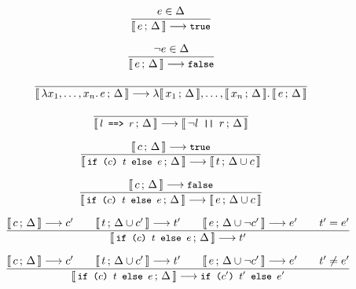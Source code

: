 \begin{figure}[htb]
\begin{framed}
 
\begin{equation}
\dfrac{
  e \in \Delta
}{
  \llbracket\, e\,;\, \Delta\, \rrbracket \longrightarrow \texttt{\small{true}}
}
\end{equation}

\begin{equation}
\dfrac{
  \neg e \in \Delta
}{
  \llbracket\, e\,;\, \Delta\, \rrbracket \longrightarrow \texttt{\small{false}}
}
\end{equation}

\begin{equation}
\dfrac{
  \empty
}{
  \lb{\lambda x_1, \ldots, x_n.\, e}{\Delta} \longrightarrow \lambda \lb{x_1}{\Delta}, \ldots, \lb{x_n}{\Delta}.\, \lb{e}{\Delta}
}
\end{equation}

\begin{equation}
\dfrac{
  \empty
}{
  \lb{\stt{$l$ ==> $r$}}{\Delta} \longrightarrow \lb{\neg l \stt{ || } r}{\Delta}
}
\end{equation}


\begin{equation}
\dfrac{
  \llbracket\, c\,;\, \Delta\, \rrbracket \longrightarrow \texttt{\small{true}}
}{
  \llbracket\, \texttt{\small{if ($c$) $t$ else $e$}}\,;\, \Delta\, \rrbracket \longrightarrow \llbracket\, t\,;\, \Delta \cup c\, \rrbracket
}
\end{equation}

\begin{equation}
\dfrac{
  \llbracket\, c\,;\, \Delta\, \rrbracket \longrightarrow \texttt{\small{false}}
}{
  \llbracket\, \texttt{\small{if ($c$) $t$ else $e$}}\,;\, \Delta\, \rrbracket \longrightarrow \llbracket\, e\,;\, \Delta \cup c\, \rrbracket
}
\end{equation}

\begin{equation}
\dfrac{
  \llbracket\, c\,;\, \Delta\, \rrbracket \longrightarrow c' \qquad
  \llbracket\, t\,;\, \Delta \cup c'\, \rrbracket \longrightarrow t' \qquad
  \llbracket\, e\,;\, \Delta \cup \neg c'\, \rrbracket \longrightarrow e' \qquad
  t' = e'
}{
  \llbracket\, \texttt{\small{if ($c$) $t$ else $e$}}\,;\, \Delta\, \rrbracket \longrightarrow t'
}
\end{equation}

\begin{equation}
\dfrac{
  \llbracket\, c\,;\, \Delta\, \rrbracket \longrightarrow c' \qquad
  \llbracket\, t\,;\, \Delta \cup c'\, \rrbracket \longrightarrow t' \qquad
  \llbracket\, e\,;\, \Delta \cup \neg c'\, \rrbracket \longrightarrow e' \qquad
  t' \not= e'
}{
  \llbracket\, \texttt{\small{if ($c$) $t$ else $e$}}\,;\, \Delta\, \rrbracket \longrightarrow \texttt{\small{if ($c'$) $t'$ else $e'$}}
}
\end{equation}


\end{framed}
\end{figure}
